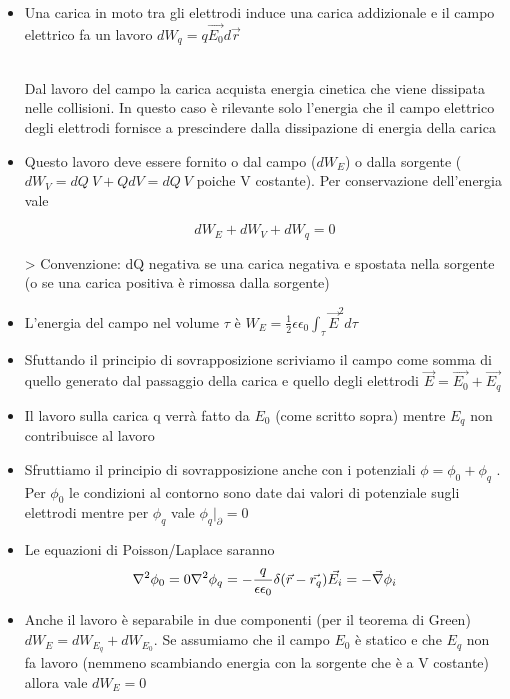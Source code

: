 \begin{itemize}
    \item Una carica in moto tra gli elettrodi induce una carica addizionale e il campo elettrico fa un lavoro $ dW_q=q \vec{E_0} d\vec{r} $

\begin{remark}\hfill \\ 
    Dal lavoro del campo la carica acquista energia cinetica che viene dissipata nelle collisioni. In questo caso è rilevante solo l'energia che il campo elettrico degli elettrodi fornisce a prescindere dalla dissipazione di energia della carica
\end{remark}

\item Questo lavoro deve essere fornito o dal campo ($dW_E$) o dalla sorgente ($dW_V=dQ\: V +Q dV=dQ\: V$ poiche V costante).
  Per conservazione dell'energia vale

$$
dW_E+dW_V+dW_q=0
$$

> Convenzione: dQ negativa se una carica negativa e spostata nella sorgente (o se una carica positiva è rimossa dalla sorgente)

\item L'energia del campo nel volume $\tau$ è $W_E=\frac{1}{2}\epsilon \epsilon_0 \int_\tau \vec{E}^2 d\tau$

\item Sfuttando il principio di sovrapposizione scriviamo il campo come somma di quello generato dal passaggio della carica e quello degli elettrodi $\vec{E}=\vec{E_0}+\vec{E_q}$

\item Il lavoro sulla carica q verrà fatto da $E_0$ (come scritto sopra) mentre $E_q$ non contribuisce al lavoro

\item Sfruttiamo il principio di sovrapposizione anche con i potenziali $\phi=\phi_0+\phi_q$ . Per $\phi_0$ le condizioni al contorno sono date dai valori di potenziale sugli elettrodi mentre per $\phi_q$ vale $\phi_q|_\partial=0$

\item Le equazioni di Poisson/Laplace saranno
  $$
  \nabla^2\phi_0=0
  \\
  \nabla^2\phi_q=-\frac{q}{\epsilon \epsilon_0}\delta(\vec{r}-\vec{r_q})
  \\
  \vec{E_i}=-\vec{\nabla}\phi_i
  $$

\item Anche il lavoro è separabile in due componenti (per il teorema di Green) $dW_E=dW_{E_q}+dW_{E_0}$.
  Se assumiamo che il campo $E_0$ è statico e che $E_q$ non fa lavoro (nemmeno scambiando energia con la sorgente che è a V costante) allora vale $dW_E=0$


\end{itemize}
